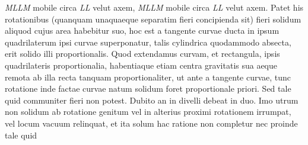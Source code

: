 \textit{MLLM} mobile circa \textit{LL} velut axem, 
\textit{MLLM} mobile circa \textit{LL} velut axem.
Patet his rotationibus (quanquam unaquaeque separatim fieri concipienda sit)
fieri solidum aliquod cujus area habebitur 
suo, hoc est a tangente curvae ducta in ipsum quadrilaterum\bracks{,}
ipsi curvae superponatur, talis 
cylindrica quodammodo absecta, erit solido illi proportionalis. Quod 
extendamus curvam, et 
rectangula, ipsis quadrilateris 
proportionalia, habentiaque etiam centra gravitatis sua aeque remota ab illa recta tanquam 
proportionaliter, ut ante a tangente curvae, tunc rotatione inde factae curvae natum solidum foret proportionale priori. Sed tale quid communiter fieri non potest. Dubito an in 
divelli debeat in duo. Imo utrum non solidum ab 
rotatione genitum 
vel in alterius proximi rotationem irrumpat, vel locum vacuum relinquat,
et ita solum hac ratione non completur nec proinde tale quid  
%
%
